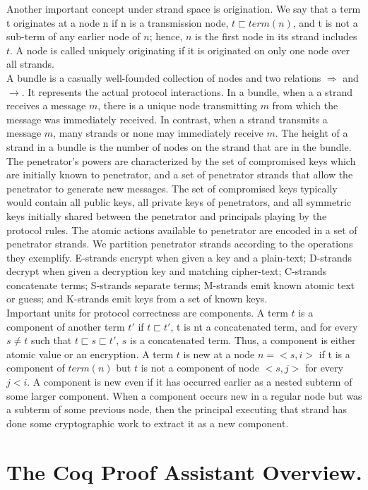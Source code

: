 Another important concept under strand space is origination. We say that a term t originates at a node n if n is a transmission node, $t \sqsubset term(n)$, and t is not a sub-term of any earlier node of $n$; hence, $n$ is the first node in its strand includes $t$. A node is called uniquely originating if it is originated on only one node over all strands. \\
A bundle is a casually well-founded collection of nodes and two relations $\Rightarrow$ and $\rightarrow$. It represents the actual protocol interactions. In a bundle, when a a strand receives a message $m$, there is a unique node transmitting $m$ from which the message was immediately  received. In contrast, when a strand transmits a message $m$, many strands or none may immediately receive $m$. The height of a strand in a bundle is the number of nodes on the strand that are in the bundle.\\
The penetrator's powers are characterized by the set of compromised keys which are initially known to penetrator, and a set of penetrator strands that allow the penetrator to generate new messages. The set of compromised keys typically would contain all public keys, all private keys of penetrators, and all symmetric keys initially shared between the penetrator and principals playing by the protocol rules. The atomic actions available to penetrator are encoded in a set of penetrator strands. We partition penetrator strands according to the operations they exemplify. E-strands encrypt when given a key and a plain-text; D-strands decrypt when given a decryption key and matching cipher-text; C-strands concatenate terms; S-strands separate terms; M-strands emit known atomic text or guess; and K-strands emit keys from a set of known keys.\\
Important units for protocol correctness are components. A term $t$ is a component of another term $t'$ if $t \sqsubset t'$, t is nt a concatenated term, and for every $s \neq t$ such that $t \sqsubset s \sqsubset t'$, $s$ is a concatenated term. Thus, a component is either atomic value or an encryption. A term $t$ is new at a node $n=<s,i>$ if t is a component of $term(n)$ but $t$ is not a component of node $<s,j>$ for every $j < i$. A component is new even if it has occurred earlier as a nested subterm of some larger component. When a component occurs new in a regular node but was a subterm of some previous node, then the principal executing that strand has done some cryptographic work to extract it as a new component. 
\section{The Coq Proof Assistant Overview.}
